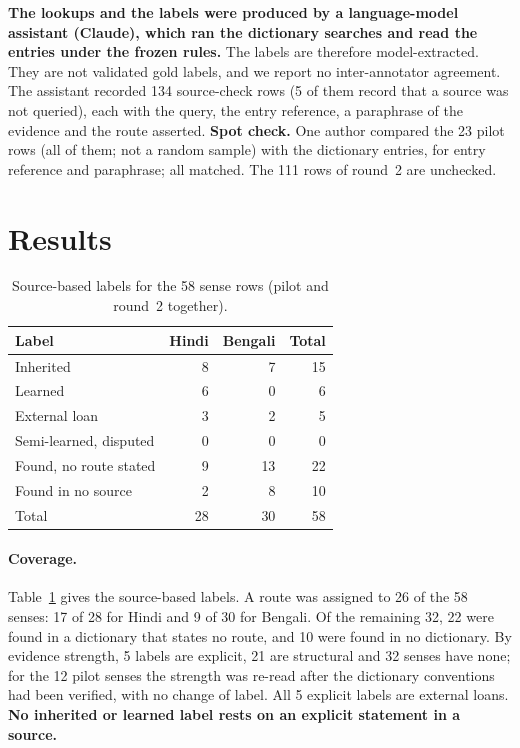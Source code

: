\documentclass[11pt]{article}
\begin{document}
\textbf{The lookups and the labels were produced by a language-model assistant (Claude), which ran the dictionary searches and read the entries under the frozen rules.} The labels are therefore model-extracted. They are not validated gold labels, and we report no inter-annotator agreement. The assistant recorded 134 source-check rows (5 of them record that a source was not queried), each with the query, the entry reference, a paraphrase of the evidence and the route asserted. \textbf{Spot check.} One author compared the 23 pilot rows (all of them; not a random sample) with the dictionary entries, for entry reference and paraphrase; all matched. The 111 rows of round~2 are unchecked.

\section{Results}

\begin{table}[t]
\centering\small
\begin{tabular}{lrrr}
\toprule
\textbf{Label} & \textbf{Hindi} & \textbf{Bengali} & \textbf{Total} \\
\midrule
Inherited & 8 & 7 & 15 \\
Learned & 6 & 0 & 6 \\
External loan & 3 & 2 & 5 \\
Semi-learned, disputed & 0 & 0 & 0 \\
\midrule
Found, no route stated & 9 & 13 & 22 \\
Found in no source & 2 & 8 & 10 \\
\midrule
Total & 28 & 30 & 58 \\
\bottomrule
\end{tabular}
\caption{Source-based labels for the 58 sense rows (pilot and round~2 together).}
\label{tab:labels}
\end{table}

\paragraph{Coverage.} Table~\ref{tab:labels} gives the source-based labels. A route was assigned to 26 of the 58 senses: 17 of 28 for Hindi and 9 of 30 for Bengali. Of the remaining 32, 22 were found in a dictionary that states no route, and 10 were found in no dictionary. By evidence strength, 5 labels are explicit, 21 are structural and 32 senses have none; for the 12 pilot senses the strength was re-read after the dictionary conventions had been verified, with no change of label. All 5 explicit labels are external loans. \textbf{No inherited or learned label rests on an explicit statement in a source.}
\end{document}
